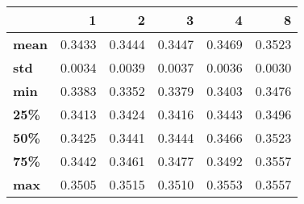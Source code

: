 \begin{tabular}{lrrrrr}
\toprule
{} &       1 &       2 &       3 &       4 &       8 \\
\midrule
\textbf{mean} &  0.3433 &  0.3444 &  0.3447 &  0.3469 &  0.3523 \\
\textbf{std } &  0.0034 &  0.0039 &  0.0037 &  0.0036 &  0.0030 \\
\textbf{min } &  0.3383 &  0.3352 &  0.3379 &  0.3403 &  0.3476 \\
\textbf{25\% } &  0.3413 &  0.3424 &  0.3416 &  0.3443 &  0.3496 \\
\textbf{50\% } &  0.3425 &  0.3441 &  0.3444 &  0.3466 &  0.3523 \\
\textbf{75\% } &  0.3442 &  0.3461 &  0.3477 &  0.3492 &  0.3557 \\
\textbf{max } &  0.3505 &  0.3515 &  0.3510 &  0.3553 &  0.3557 \\
\bottomrule
\end{tabular}
